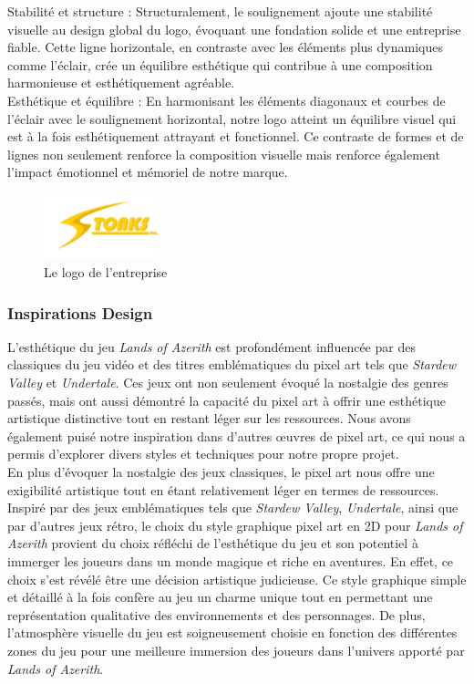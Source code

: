 Stabilité et structure : Structuralement, le soulignement ajoute une stabilité visuelle au design global du logo, évoquant une fondation solide et une entreprise fiable.
Cette ligne horizontale, en contraste avec les éléments plus dynamiques comme l'éclair, crée un équilibre esthétique qui contribue à une composition harmonieuse et esthétiquement agréable.
\\

Esthétique et équilibre : En harmonisant les éléments diagonaux et courbes de l'éclair avec le soulignement horizontal, notre logo atteint un équilibre visuel qui est à la fois esthétiquement attrayant et fonctionnel.
Ce contraste de formes et de lignes non seulement renforce la composition visuelle mais renforce également l'impact émotionnel et mémoriel de notre marque.

\begin{figure}[H]
      \centering
      \includegraphics[width=0.3\textwidth]{assets/logo_stonks.png}
      \caption{Le logo de l'entreprise}
      \label{fig:website1}
\end{figure}

\subsubsection{Inspirations Design}

L'esthétique du jeu \textit{Lands of Azerith} est profondément influencée par des classiques du jeu vidéo et des titres emblématiques du pixel art tels que \textit{Stardew Valley} et \textit{Undertale}.
Ces jeux ont non seulement évoqué la nostalgie des genres passés, mais ont aussi démontré la capacité du pixel art à offrir une esthétique artistique distinctive tout en restant léger sur les ressources.
Nous avons également puisé notre inspiration dans d'autres œuvres de pixel art, ce qui nous a permis d'explorer divers styles et techniques pour notre propre projet.
\\

En plus d'évoquer la nostalgie des jeux classiques, le pixel art nous offre une exigibilité artistique tout en étant relativement léger en termes de ressources.
Inspiré par des jeux emblématiques tels que \textit{Stardew Valley}, \textit{Undertale}, ainsi que par d'autres jeux rétro, le choix du style graphique pixel art en 2D pour
\textit{Lands of Azerith} provient du choix réfléchi de l'esthétique du jeu et son potentiel à immerger les joueurs dans un monde magique et riche en aventures.
En effet, ce choix s'est révélé être une décision artistique judicieuse.
Ce style graphique simple et détaillé à la fois confère au jeu un charme unique tout en permettant une représentation qualitative des environnements et des personnages.
De plus, l'atmosphère visuelle du jeu est soigneusement choisie en fonction des différentes zones du jeu pour une meilleure immersion des joueurs dans l'univers apporté par \textit{Lands of Azerith}.

